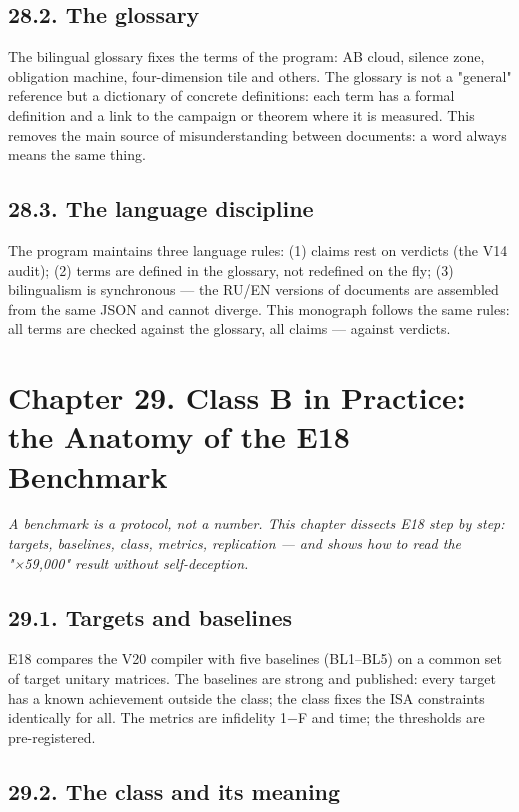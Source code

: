 \documentclass[11pt,a4paper]{article}
\begin{document}
\subsection{28.2. The glossary}

The bilingual glossary fixes the terms of the program: AB cloud, silence zone, obligation machine, four-dimension tile and others. The glossary is not a "general" reference but a dictionary of concrete definitions: each term has a formal definition and a link to the campaign or theorem where it is measured. This removes the main source of misunderstanding between documents: a word always means the same thing.

\subsection{28.3. The language discipline}

The program maintains three language rules: (1) claims rest on verdicts (the V14 audit); (2) terms are defined in the glossary, not redefined on the fly; (3) bilingualism is synchronous — the RU/EN versions of documents are assembled from the same JSON and cannot diverge. This monograph follows the same rules: all terms are checked against the glossary, all claims — against verdicts.

\section{Chapter 29. Class B in Practice: the Anatomy of the E18 Benchmark}

\noindent\textit{\color{copper}A benchmark is a protocol, not a number. This chapter dissects E18 step by step: targets, baselines, class, metrics, replication — and shows how to read the "×59,000" result without self-deception.}

\subsection{29.1. Targets and baselines}

E18 compares the V20 compiler with five baselines (BL1–BL5) on a common set of target unitary matrices. The baselines are strong and published: every target has a known achievement outside the class; the class fixes the ISA constraints identically for all. The metrics are infidelity 1−F and time; the thresholds are pre-registered.

\subsection{29.2. The class and its meaning}
\end{document}
